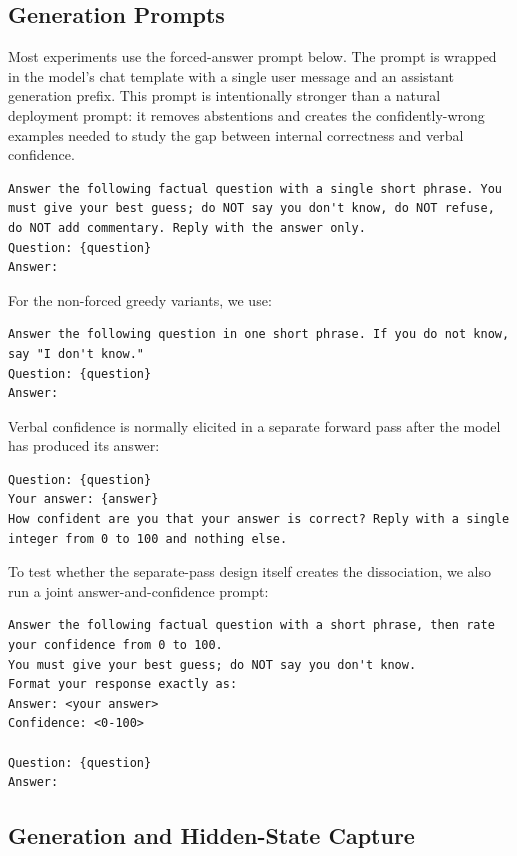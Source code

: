 \documentclass{article}
\begin{document}
\subsection{Generation Prompts}

Most experiments use the forced-answer prompt below. The prompt is wrapped in the
model's chat template with a single user message and an assistant generation
prefix. This prompt is intentionally stronger than a natural deployment prompt:
it removes abstentions and creates the confidently-wrong examples needed to study
the gap between internal correctness and verbal confidence.

\begin{verbatim}
Answer the following factual question with a single short phrase. You must give your best guess; do NOT say you don't know, do NOT refuse, do NOT add commentary. Reply with the answer only.
Question: {question}
Answer:
\end{verbatim}

For the non-forced greedy variants, we use:

\begin{verbatim}
Answer the following question in one short phrase. If you do not know, say "I don't know."
Question: {question}
Answer:
\end{verbatim}

Verbal confidence is normally elicited in a separate forward pass after the model
has produced its answer:

\begin{verbatim}
Question: {question}
Your answer: {answer}
How confident are you that your answer is correct? Reply with a single integer from 0 to 100 and nothing else.
\end{verbatim}

To test whether the separate-pass design itself creates the dissociation, we also
run a joint answer-and-confidence prompt:

\begin{verbatim}
Answer the following factual question with a short phrase, then rate your confidence from 0 to 100.
You must give your best guess; do NOT say you don't know.
Format your response exactly as:
Answer: <your answer>
Confidence: <0-100>

Question: {question}
Answer:
\end{verbatim}

\subsection{Generation and Hidden-State Capture}
\end{document}
